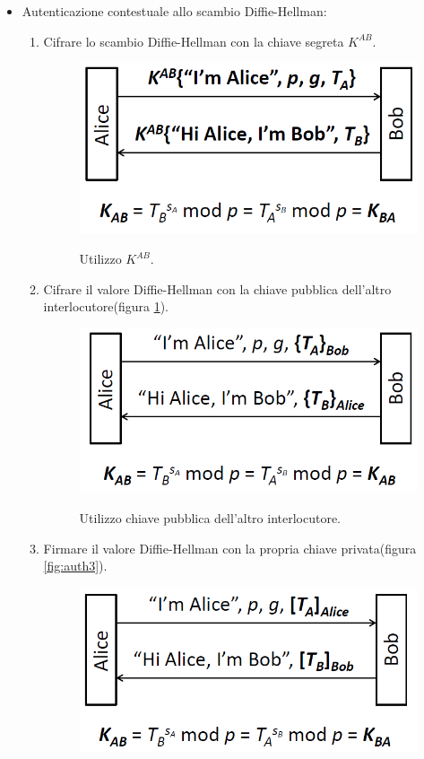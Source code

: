 \begin{itemize}
\item Autenticazione contestuale allo scambio Diffie-Hellman: \begin{enumerate}
\item Cifrare lo scambio Diffie-Hellman con la chiave segreta $K^{AB}$.
\begin{figure}[htbp]
	\centering%
	\subfigure%
	{\includegraphics[scale=0.5, keepaspectratio]{Immagini/Capitolo6/DiffieHellman_auth1.png}}
	\caption{Utilizzo $K^{AB}$.}
	\end{figure}
\item Cifrare il valore Diffie-Hellman con la chiave pubblica dell'altro interlocutore(figura \ref{fig:auth2}).
\begin{figure}[htbp]
	\centering%
	\subfigure%
	{\includegraphics[scale=0.5, keepaspectratio]{Immagini/Capitolo6/DiffieHellman_auth2.png}}
	\caption{Utilizzo chiave pubblica dell'altro interlocutore.}
	\label{fig:auth2}
	\end{figure}
\item Firmare il valore Diffie-Hellman con la propria chiave privata(figura \ref{fig:auth3}).
\begin{figure}[htbp]
	\centering
	\subfigure
	{\includegraphics[scale=0.5, keepaspectratio]{Immagini/Capitolo6/DiffieHellman_auth3.png}}

\end{figure}
\end{enumerate}
\end{itemize}
